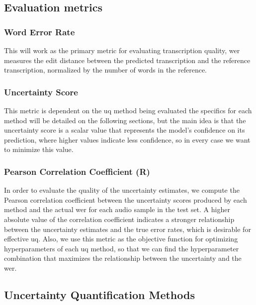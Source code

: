 \documentclass[11pt]{article}
\begin{document}
\subsection{Evaluation metrics}

\subsubsection{Word Error Rate}
This will work as the primary metric for evaluating transcription quality, \acrshort{wer} measures the edit distance between the predicted transcription and the reference transcription, normalized by the number of words in the reference.

\subsubsection{Uncertainty Score}
This metric is dependent on the \acrshort{uq} method being evaluated the specifics for each method will be detailed on the following sections, but the main idea is that the uncertainty score is a scalar value that represents the model's confidence on its prediction, where higher values indicate less confidence, so in every case we want to minimize this value.

\subsubsection{Pearson Correlation Coefficient (R)}
In order to evaluate the quality of the uncertainty estimates, we compute the Pearson correlation coefficient between the uncertainty scores produced by each method and the actual \acrshort{wer} for each audio sample in the test set. A higher absolute value of the correlation coefficient indicates a stronger relationship between the uncertainty estimates and the true error rates, which is desirable for effective \acrshort{uq}.
Also, we use this metric as the objective function for optimizing hyperparameters of each \acrshort{uq} method, so that we can find the hyperparameter combination that maximizes the relationship between the uncertainty and the \acrshort{wer}.

\subsection{Uncertainty Quantification Methods}
\end{document}
